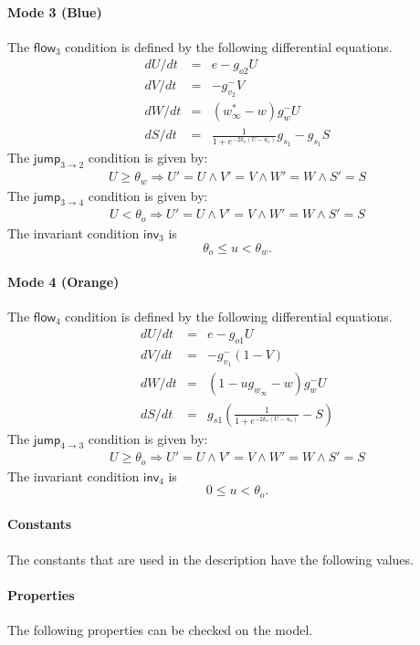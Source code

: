\documentclass{article}
\newcommand{\flow}{\mathsf{flow}}
\newcommand{\jump}{\mathsf{jump}}
\newcommand{\inv}{\mathsf{inv}}
\begin{document}
\paragraph{Mode 3 (Blue)}
The $\flow_3$ condition is defined by the following differential equations.
\begin{eqnarray*}
dU/dt &=& e  -g_{o2}U\\
dV/dt &=& -g_{v_2}^- V\\
dW/dt &=& (w^*_{\infty} - w) g_w^- U\\
dS/dt &=& \frac{1}{1+e^{-2k_s(U-u_s)}}g_{s_1} - g_{s_1}S
\end{eqnarray*}
The $\jump_{3\rightarrow 2}$ condition is given by:
\begin{eqnarray*}
U \geq \theta_w \Longrightarrow U' = U \wedge V' = V \wedge W' = W \wedge S'
= S
\end{eqnarray*}
The $\jump_{3\rightarrow 4}$ condition is given by:
\begin{eqnarray*}
U < \theta_o \Longrightarrow U' = U \wedge V' = V \wedge W' = W \wedge S'
= S
\end{eqnarray*}
The invariant condition $\inv_3$ is
$$\theta_o\leq u< \theta_w.$$


\paragraph{Mode 4 (Orange)}
The $\flow_4$ condition is defined by the following differential equations.
\begin{eqnarray*}
dU/dt &=& e  -g_{o1}U\\
dV/dt &=& -g_{v_1}^-(1- V)\\
dW/dt &=& (1 - ug_{w_{\infty}} - w) g_w^- U\\
dS/dt &=& g_{s1}(\frac{1}{1+e^{-2k_s(U-u_s)}} - S)
\end{eqnarray*}
The $\jump_{4\rightarrow 3}$ condition is given by:
\begin{eqnarray*}
U \geq \theta_o \Longrightarrow U' = U \wedge V' = V \wedge W' = W \wedge S'
= S
\end{eqnarray*}
The invariant condition $\inv_4$ is
$$0\leq u< \theta_o.$$

\paragraph{Constants} The constants that are used in the description have the
following values. 

\paragraph{Properties}
The following properties can be checked on the model. 
\end{document}
